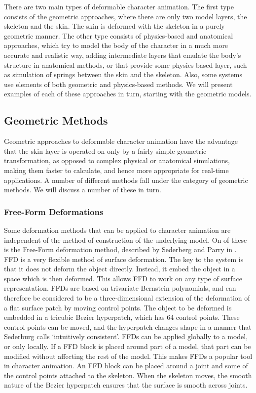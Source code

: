 \documentclass[10pt,oneside,fleqn,a4paper]{book}
\begin{document}
There are two main types of deformable character animation. The first type consists of the geometric approaches, where there are only two model layers, the skeleton and the skin. The skin is deformed with the skeleton in a purely geometric manner. The other type consists of physics-based and anatomical approaches, which try to model the body of the character in a much more accurate and realistic way, adding intermediate layers that emulate the body's structure in anatomical methods, or that provide some physics-based layer, such as simulation of springs between the skin and the skeleton. Also, some systems use elements of both geometric and physics-based methods. We will present examples of each of these approaches in turn, starting with the geometric models.

\subsection{\label{sec:reviewgeometric}Geometric Methods}
Geometric approaches to deformable character animation have the advantage that the skin layer is operated on only by a fairly simple geometric transformation, as opposed to complex physical or anatomical simulations, making them faster to calculate, and hence more appropriate for real-time applications. A number of different methods fall under the category of geometric methods. We will discuss a number of these in turn.

\subsubsection{Free-Form Deformations}
Some deformation methods that can be applied to character animation are independent of the method of construction of the underlying model. On of these is the Free-Form deformation method, described by Sederberg and Parry in \cite{Sederberg86}. FFD is a very flexible method of surface deformation. The key to the system is that it does not deform the object directly. Instead, it embed the object in a space which is then deformed. This allows FFD to work on any type of surface representation. FFDs are based on trivariate Bernstein polynomials, and can therefore be considered to be a three-dimensional extension of the deformation of a flat surface patch by moving control points. The object to be deformed is embedded in a tricubic Bezier hyperpatch, which has 64 control points. These control points can be moved, and the hyperpatch changes shape in a manner that Sederburg calls `intuitively consistent'. FFDs can be applied globally to a model, or only locally. If a FFD block is placed around part of a model, that part can be modified without affecting the rest of the model. This makes FFDs a popular tool in character animation. An FFD block can be placed around a joint and some of the control points attached to the skeleton. When the skeleton moves, the smooth nature of the Bezier hyperpatch ensures that the surface is smooth across joints.
\end{document}
